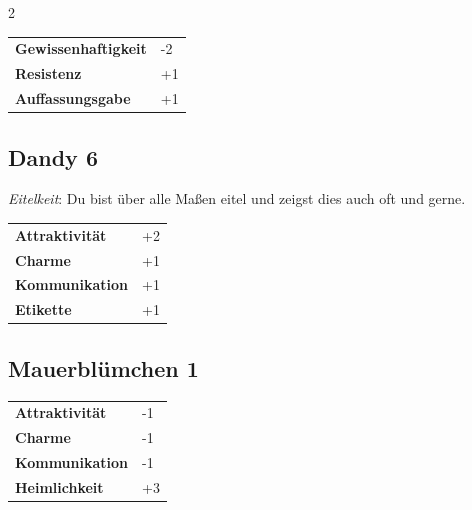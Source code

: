 \begin{multicols}{2}
\begin{tcolorbox}
\begin{tabular}{@{}ll@{}}
    \textbf{Gewissenhaftigkeit} & -2\\
    \textbf{Resistenz} & +1\\
    \textbf{Auffassungsgabe} & +1\\
\end{tabular}


\end{tcolorbox}

\begin{tcolorbox}
    \subsection*{Dandy \hfill \small{6 }}
    \tcblower
\textit{Eitelkeit}: Du bist über alle Maßen eitel und zeigst dies auch oft und gerne.


\vspace{3mm}

\begin{tabular}{@{}ll@{}}
    \textbf{Attraktivität} & +2\\
    \textbf{Charme} & +1\\
    \textbf{Kommunikation} & +1\\
    \textbf{Etikette} & +1\\
\end{tabular}


\end{tcolorbox}

\begin{tcolorbox}
    \subsection*{Mauerblümchen \hfill \small{1 }}
    \tcblower




\begin{tabular}{@{}ll@{}}
    \textbf{Attraktivität} & -1\\
    \textbf{Charme} & -1\\
    \textbf{Kommunikation} & -1\\
    \textbf{Heimlichkeit} & +3\\
\end{tabular}


\end{tcolorbox}
\end{multicols}
